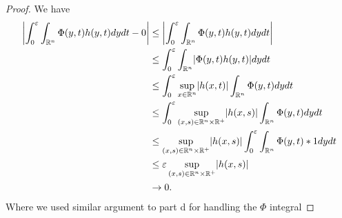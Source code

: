   \begin{proof}
   We have 
   \begin{align*}
     \abs*{\int_0^{\epsilon} \int_{\mathbb{R}^{n} } \Phi(y,t)h(y,t) dy dt - 0} &\le \abs*{\int_0^{\epsilon} \int_{\mathbb{R}^{n} } \Phi(y,t)h(y,t) dy dt}\\
                                                                               &\le \int_0^{\epsilon} \int_{\mathbb{R}^{n} } \abs*{\Phi(y,t)h(y,t)} dy dt\\
                                                                               &\le  \int_0^{\epsilon}  \sup_{x \in  \mathbb{R}^{n} } \abs{h(x,t)} \int_{\mathbb{R}^{n} }\Phi(y,t) dy dt\\
                                                                               &\le  \int_0^{\epsilon}  \sup_{(x,s) \in  \mathbb{R}^{n} \times \mathbb{R}^{+}  } \abs{h(x,s)} \int_{\mathbb{R}^{n} }\Phi(y,t) dy dt\\
                                                                               &\le  \sup_{(x,s) \in  \mathbb{R}^{n} \times \mathbb{R}^{+}  } \abs{h(x,s)} \int_0^{\epsilon}  \int_{\mathbb{R}^{n} }\Phi(y,t) *1 dy dt\\
                                                                               &\le \epsilon \sup_{(x,s) \in  \mathbb{R}^{n} \times \mathbb{R}^{+}  } \abs{h(x,s)} \\
                                                                               &\to  0
   .\end{align*}
   Where we used similar argument to part d for handling the $\Phi $ integral
  \end{proof}
